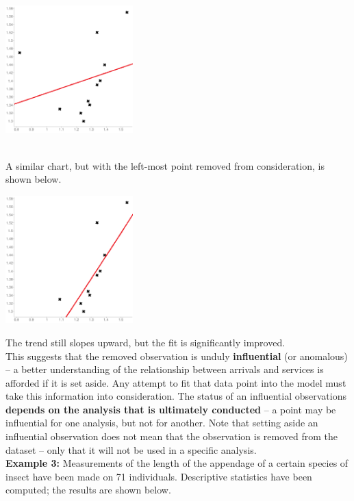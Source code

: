 \documentclass[20pt,landscape,footrule,headrule]{foils}
\newcommand{\newl}{\newline\newline}
\begin{document}
\begin{center}
\includegraphics[width=0.37\textwidth]{Images/scatter_plot_linear_1}
\end{center}
\newpage\ \\ \noindent 
A similar chart, but with the left-most point removed from consideration, is shown below. 
\begin{center}
\includegraphics[width=0.37\textwidth]{Images/scatter_plot_linear_2}
\end{center}
The trend still slopes upward, but the fit is significantly improved. \newpage\ \\ \noindent This suggests that the removed observation is unduly \textbf{influential} (or anomalous) -- a better understanding of the relationship between arrivals and services is afforded if it is set aside. 
\newl Any attempt to fit that data point into the model must take this information into consideration. \newl The status of an influential observations \textbf{depends on the analysis that is ultimately conducted} -- a point may be influential for one analysis, but not for another. 
\newl Note that setting aside an influential observation does not mean that the observation is removed from the dataset -- only that it will not be used in a specific analysis. 
\newpage\ \\ \noindent \textbf{Example 3:} Measurements of the length of the appendage of a certain species of insect have been made on 71 individuals. Descriptive statistics have been computed; the results are shown below.
\end{document}
